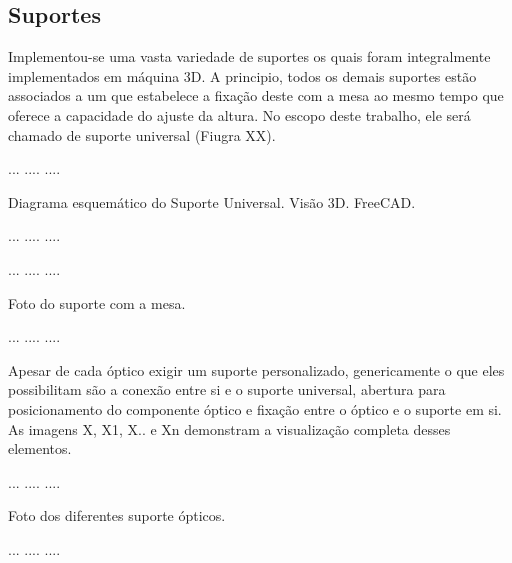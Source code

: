 \documentclass[oneside,openright,12pt]{ufsm_2021} %
\begin{document}
        \subsection{Suportes}
            \par Implementou-se uma vasta variedade de suportes os quais foram integralmente implementados em máquina 3D. A principio, todos os demais suportes estão associados a um que estabelece a fixação deste com a mesa ao mesmo tempo que oferece a capacidade do ajuste da altura. No escopo deste trabalho, ele será chamado de suporte universal (Fiugra XX).

            \par ...    ....    ....
            \par Diagrama esquemático do Suporte Universal. Visão 3D. FreeCAD. 
            \par ...    ....    ....

            \par ...    ....    ....
            \par Foto do suporte com  a mesa. 
            \par ...    ....    ....

            \par Apesar de cada óptico exigir um suporte personalizado, genericamente o que eles possibilitam são a conexão entre si e o suporte universal, abertura para posicionamento do componente óptico e fixação entre o óptico e o suporte em si. As imagens X, X1, X.. e Xn demonstram a visualização completa desses elementos.

            \par ...    ....    ....
            \par Foto dos diferentes suporte ópticos. 
            \par ...    ....    ....      
            
\end{document}
